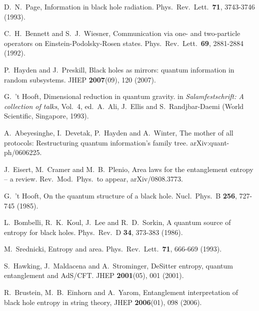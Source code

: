 \documentclass[twocolumn,aps,prl,amsmath,amssymb,floatfix]{revtex4}
\begin{document}
\begin{thebibliography}{18}

 D.\ N.\ Page,
Information in black hole radiation.
Phys.\ Rev.\ Lett.\ {\bf 71}, 3743-3746 (1993).

 C.\ H.\ Bennett and S.\ J.\ Wiesner,
Communication via one- and two-particle operators on
Einstein-Podolsky-Rosen states.
Phys.\ Rev.\ Lett.\ {\bf 69}, 2881-2884 (1992).

 P.\ Hayden and J.\ Preskill,
Black holes as mirrors: quantum information in random subsystems.
JHEP {\bf 2007}(09), 120 (2007).

 G.\ 't Hooft,
Dimensional reduction in quantum gravity.
in {\it Salamfestschrift: A collection of talks}, 
Vol.\ 4, ed.\ A.\ Ali, J.\ Ellis and S.\ Randjbar-Daemi
(World Scientific, Singapore, 1993).

 A.\ Abeyesinghe, I.\ Devetak, P.\ Hayden and A.\ Winter,
The mother of all protocols: Restructuring quantum information's family
tree.
arXiv:quant-ph/0606225.

 J.\ Eisert, M.\ Cramer and M.\ B.\ Plenio,
Area laws for the entanglement entropy -- a review.
Rev.\ Mod.\ Phys.\ to appear, arXiv/0808.3773.



 G.\ 't Hooft,
On the quantum structure of a black hole.
Nucl.\ Phys.\ B {\bf 256}, 727-745 (1985).

 L.\ Bombelli, R.\ K.\ Koul, J.\ Lee and R.\ D.\ Sorkin,
A quantum source of entropy for black holes.
Phys.\ Rev.\ D {\bf 34}, 373-383 (1986).

 M.\ Srednicki,
Entropy and area.
Phys.\ Rev.\ Lett.\ {\bf 71}, 666-669 (1993).

 S.\ Hawking, J.\ Maldacena and A.\ Strominger,
DeSitter entropy, quantum entanglement and AdS/CFT.
JHEP {\bf 2001}(05), 001 (2001).

 R.\ Brustein, M.\ B.\ Einhorn and A.\ Yarom,
Entanglement interpretation of black hole entropy in string theory,
JHEP {\bf 2006}(01), 098 (2006).


\end{thebibliography}
\end{document}
